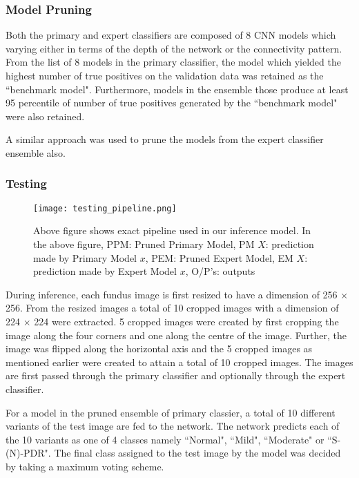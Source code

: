 \documentclass{paper}
\begin{document}
\subsubsection*{Model Pruning}
Both the primary and expert classifiers are composed of 8 CNN models which varying either in terms of the depth of the network or the connectivity pattern. From the list of 8 models in the primary classifier, the model which yielded the highest number of true positives on the validation data was retained as the ``benchmark model". Furthermore, models in the ensemble those produce at least 95 percentile of number of true positives generated by the ``benchmark model" were also retained.
\par A similar approach was used to prune the models from the expert classifier ensemble also.

\subsubsection*{Testing}

\begin{figure}[H]
\centering
\texttt{[image: testing\_pipeline.png]}
\caption{Above figure shows exact pipeline used in our inference model. In the above figure, PPM: Pruned Primary Model, PM $X$:  prediction made by Primary Model $x$, PEM: Pruned Expert Model, EM $X$: prediction made by Expert Model $x$, O/P's: outputs}
\label{ _pipeline}
\end{figure}  

During inference, each fundus image is first resized to have a dimension of 256 $\times$ 256. From the resized images a total of 10 cropped images with a dimension of 224 $\times$ 224 were extracted. 5 cropped images were created by first cropping the image along the four corners and one along the centre of the image. Further, the image was flipped along the horizontal axis and the 5 cropped images as mentioned earlier were created to attain a total of 10 cropped images. The images are first passed through the primary classifier and optionally through the expert classifier.  

\par For a model in the pruned ensemble of primary classier, a total of 10 different variants of the test image are fed to the network. The network predicts each of the 10 variants as one of 4 classes namely ``Normal", ``Mild", ``Moderate" or ``S-(N)-PDR". The final class assigned to the test image by the model was decided by taking a maximum voting scheme.
\end{document}
